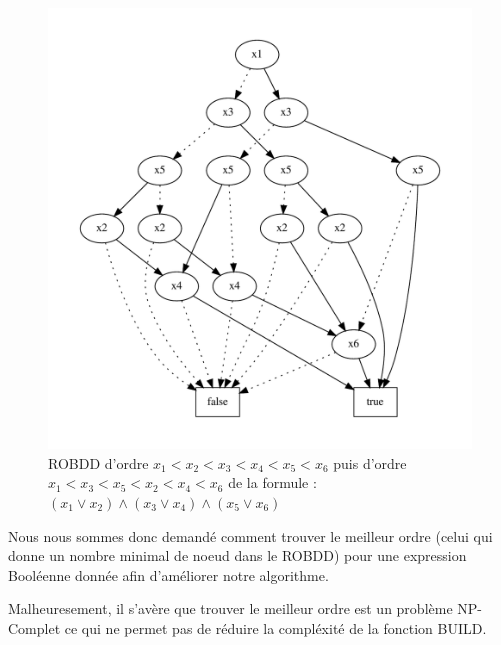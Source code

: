 \documentclass[a4paper, oneside]{report}
\begin{document}
\begin{figure}[h]
      \includegraphics[scale = 0.5]{exemple/mauvais_Ordre.pdf}
    \caption{ROBDD d'ordre $x_1<x_2<x_3<x_4<x_5<x_6$ puis d'ordre $x_1<x_3<x_5<x_2<x_4<x_6$ de la formule : $ (x_1 \vee x_2) \wedge (x_3 \vee x_4) \wedge (x_5 \vee x_6)$}
\end{figure}

Nous nous sommes donc demandé comment trouver le meilleur ordre (celui qui donne un nombre minimal de noeud dans le ROBDD) pour une expression Booléenne donnée afin d'améliorer notre algorithme.

Malheuresement, il s'avère que trouver le meilleur ordre est un problème NP-Complet ce qui ne permet pas de réduire la compléxité de la fonction BUILD.


\end{document}
